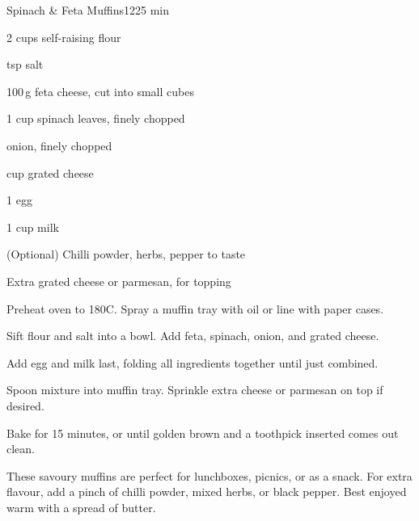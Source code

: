 \begin{recipebox}{Spinach \& Feta Muffins}{12}{25 min}
\begin{ingredients}
  \item 2 cups self-raising flour
  \item {} tsp salt
  \item 100\,g feta cheese, cut into small cubes
  \item 1 cup spinach leaves, finely chopped
  \item {} onion, finely chopped
  \item {} cup grated cheese
  \item 1 egg
  \item 1 cup milk
  \item (Optional) Chilli powder, herbs, pepper to taste
  \item Extra grated cheese or parmesan, for topping
\end{ingredients}

\begin{method}
  \item Preheat oven to 180\degree C. Spray a muffin tray with oil or line with paper cases.
  \item Sift flour and salt into a bowl. Add feta, spinach, onion, and grated cheese.  
  \item Add egg and milk last, folding all ingredients together until just combined.  
  \item Spoon mixture into muffin tray. Sprinkle extra cheese or parmesan on top if desired.  
  \item Bake for 15 minutes, or until golden brown and a toothpick inserted comes out clean.  
\end{method}

\begin{notes}
These savoury muffins are perfect for lunchboxes, picnics, or as a snack.  
For extra flavour, add a pinch of chilli powder, mixed herbs, or black pepper.  
Best enjoyed warm with a spread of butter.  
\end{notes}
\end{recipebox}
